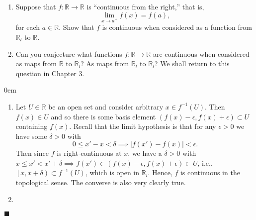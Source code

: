 \documentclass[12pt]{article}
\renewcommand{\qed}{\hfill$\blacksquare$}
\renewenvironment{proof}{\begin{addmargin}[1em]{0em}\begin{newproof}}{\end{newproof}\end{addmargin}\qed}
\newenvironment{problem}[2][Exercise]{\begin{trivlist}
\item[\hskip \labelsep {\bfseries #1}\hskip \labelsep {\bfseries #2.}]}{\end{trivlist}}
\begin{document}
\begin{problem}{18.7}
\begin{enumerate}[label=(\alph*)]
	\item Suppose that $f:\mathbb{R}\rightarrow \mathbb{R}$ is ``continuous from the right,'' that is, $$ \lim_{x\rightarrow a^+} f\left(x\right) = f\left(a\right), $$ for each $a\in \mathbb{R}$. Show that $f$ is continuous when considered as a function from $\mathbb{R}_l$ to $\mathbb{R}$.
	\item Can you conjecture what functions $f:\mathbb{R}\rightarrow \mathbb{R}$ are continuous when considered as maps from $\mathbb{R}$ to $\mathbb{R}_l$? As maps from $\mathbb{R}_l$ to $\mathbb{R}_l$? We shall return to this question in Chapter 3.
\end{enumerate}
\end{problem}
\begin{proof}
\begin{enumerate}[label=(\alph*)]
	\item Let $U\in \mathbb{R}$ be an open set and consider arbitrary $x \in f^{-1}\left(U\right)$. Then $f\left(x\right) \in U$ and so there is some basis element $\left(f\left(x\right)-\epsilon, f\left(x\right)+\epsilon\right) \subset U$ containing $f\left(x\right)$. Recall that the limit hypothesis is that for any $\epsilon>0$ we have some $\delta>0$ with $$ 0\leq x'-x < \delta \implies \left|f\left(x'\right)-f\left(x\right)\right|<\epsilon. $$ Then since $f$ is right-continuous at $x$, we have a $\delta>0$ with $x\leq x' < x'+\delta \implies f\left(x'\right) \in \left(f\left(x\right)-\epsilon, f\left(x\right)+\epsilon\right) \subset U$, i.e., $\left[x,x+\delta\right)\subset f^{-1}\left(U\right)$, which is open in $\mathbb{R}_l$. Hence, $f$ is continuous in the topological sense. The converse is also very clearly true.
	
	\item 
\end{enumerate}
\end{proof}
\end{document}
